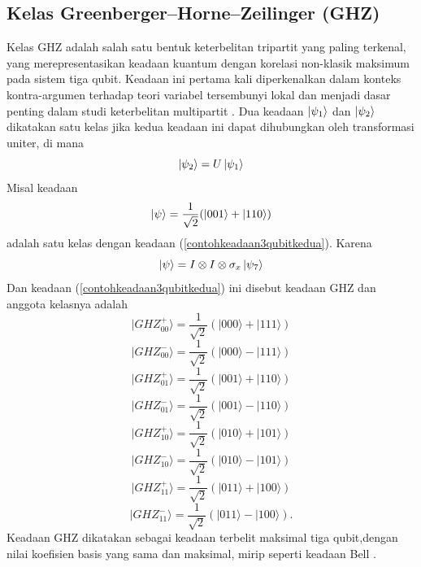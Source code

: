 \subsection{Kelas Greenberger–Horne–Zeilinger (GHZ)}
Kelas GHZ adalah salah satu bentuk keterbelitan tripartit yang paling terkenal, yang merepresentasikan keadaan kuantum dengan korelasi non-klasik maksimum pada sistem tiga qubit. Keadaan ini pertama kali diperkenalkan dalam konteks kontra-argumen terhadap teori variabel tersembunyi lokal dan menjadi dasar penting dalam studi keterbelitan multipartit \cite{ghz1989, dur2000three}. Dua keadaan $\ket{\psi_1}$ dan $\ket{\psi_2}$ dikatakan satu kelas jika kedua keadaan ini dapat dihubungkan oleh transformasi uniter, di mana
\begin{equation}
	\ket{\psi_2}=U\ket{\psi_1}
\end{equation}
Misal keadaan
\begin{equation}
	\ket{\psi}=\frac{1}{\sqrt{2}}(\ket{001}+\ket{110})
\end{equation}
adalah satu kelas dengan keadaan (\ref{contohkeadaan3qubitkedua}). Karena
\begin{equation}
	\ket{\psi}=I\otimes I\otimes\sigma_x\ket{\psi_7}
\end{equation}
Dan keadaan (\ref{contohkeadaan3qubitkedua}) ini disebut keadaan GHZ dan anggota kelasnya adalah
\begin{equation}
	|\mathrm{\textit{GHZ}_{00}^+}\rangle = \frac{1}{\sqrt{2}}(|000\rangle + |111\rangle)
\end{equation}
\begin{equation}
	|\mathrm{\textit{GHZ}_{00}^-}\rangle = \frac{1}{\sqrt{2}}(|000\rangle - |111\rangle)
\end{equation}
\begin{equation}
	|\mathrm{\textit{GHZ}_{01}^+}\rangle = \frac{1}{\sqrt{2}}(|001\rangle + |110\rangle)
\end{equation}
\begin{equation}
	|\mathrm{\textit{GHZ}_{01}^-}\rangle = \frac{1}{\sqrt{2}}(|001\rangle - |110\rangle)
\end{equation}
\begin{equation}
	|\mathrm{\textit{GHZ}_{10}^+}\rangle = \frac{1}{\sqrt{2}}(|010\rangle + |101\rangle)
\end{equation}
\begin{equation}
	|\mathrm{\textit{GHZ}_{10}^-}\rangle = \frac{1}{\sqrt{2}}(|010\rangle - |101\rangle)
\end{equation}
\begin{equation}
	|\mathrm{\textit{GHZ}_{11}^+}\rangle = \frac{1}{\sqrt{2}}(|011\rangle + |100\rangle)
\end{equation}
\begin{equation}
	|\mathrm{\textit{GHZ}_{11}^-}\rangle = \frac{1}{\sqrt{2}}(|011\rangle - |100\rangle).
\end{equation}
Keadaan GHZ dikatakan sebagai keadaan terbelit maksimal tiga qubit,dengan nilai koefisien basis yang sama dan maksimal, mirip seperti keadaan Bell \cite{dur2000three}.

